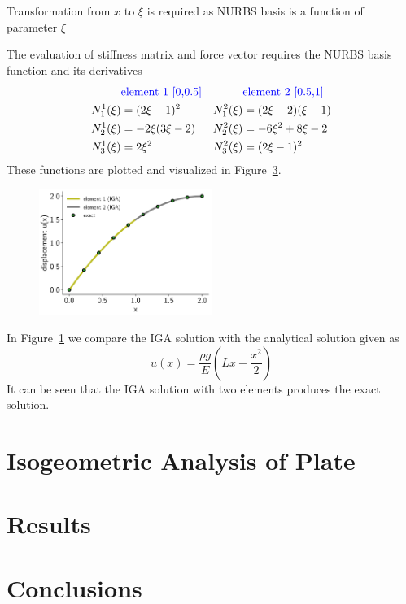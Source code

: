 \documentclass[submit,12pt]{aiaa-pretty} %
\begin{document}
Transformation from $x$ to $\xi$ is required as NURBS basis is a
function of parameter $\xi$


The evaluation of stiffness matrix and force vector requires the NURBS
basis function and its derivatives
\begin{equation}\label{eqn:bar-nurbs-derivatives}
  \begin{aligned}
    & \textcolor{blue}{\text{element 1 [0,0.5]}}  & & \textcolor{blue}{\text{element 2 [0.5,1]}} \\
    N_1^1(\xi) &=  (2 \xi -1)^2 & N_1^2(\xi) &= (2\xi-2)(\xi-1)  \\
    N_2^1(\xi) &= -2\xi(3\xi-2) &N_2^2(\xi) &= -6\xi^2 + 8\xi -2 \\
    N_3^1(\xi) &=  2\xi^2       & N_3^2(\xi) &= (2\xi -1)^2 \\
  \end{aligned}
\end{equation}
These functions are plotted and visualized in Figure~\ref{}.
\begin{figure}\label{eqn:bar-solution}
  \centering
  \includegraphics[width=0.5\textwidth]{figures/bar-solution.pdf} \\
\end{figure}
In Figure~\ref{eqn:bar-solution} we compare the IGA solution with the analytical solution given as
\begin{equation}\nonumber
  u(x) = \frac{\rho g}{E} \left( Lx - \frac{x^2}{2}\right)
\end{equation}
It can be seen that the IGA solution with two elements produces the
exact solution.

\section{Isogeometric Analysis of Plate}


\section{Results}

\section{Conclusions}
 
\end{document}
